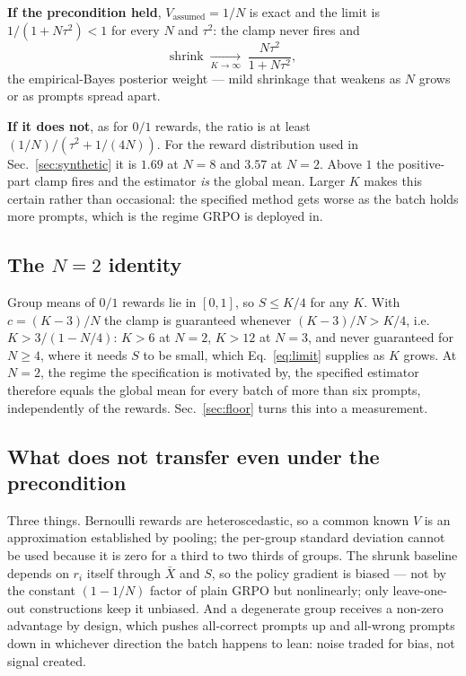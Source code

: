 \documentclass{article}
\newcommand{\shrink}{\mathrm{shrink}}
\begin{document}
\textbf{If the precondition held}, $V_{\text{assumed}}=1/N$ is exact and
the limit is $1/(1+N\tau^2)<1$ for every $N$ and $\tau^2$: the clamp never
fires and
\begin{equation}
\shrink\;\xrightarrow[K\to\infty]{}\;\frac{N\tau^2}{1+N\tau^2},
\label{eq:eb}
\end{equation}
the empirical-Bayes posterior weight --- mild shrinkage that weakens as $N$
grows or as prompts spread apart.

\textbf{If it does not}, as for $0/1$ rewards, the ratio is at least
$(1/N)/(\tau^2+1/(4N))$. For the reward distribution used in
Sec.~\ref{sec:synthetic} it is $1.69$ at $N=8$ and $3.57$ at $N=2$. Above
$1$ the positive-part clamp fires and the estimator \emph{is} the global
mean. Larger $K$ makes this certain rather than occasional: the specified
method gets worse as the batch holds more prompts, which is the regime GRPO
is deployed in.

\subsection{The $N=2$ identity}
\label{sec:identity}

Group means of $0/1$ rewards lie in $[0,1]$, so $S\le K/4$ for any $K$. With
$c=(K-3)/N$ the clamp is guaranteed whenever $(K-3)/N>K/4$, i.e.\
$K>3/(1-N/4)$: $K>6$ at $N=2$, $K>12$ at $N=3$, and never guaranteed for
$N\ge4$, where it needs $S$ to be small, which Eq.~\eqref{eq:limit}
supplies as $K$ grows. At $N=2$, the regime the specification is motivated
by, the specified estimator therefore equals the global mean for every
batch of more than six prompts, independently of the rewards.
Sec.~\ref{sec:floor} turns this into a measurement.

\subsection{What does not transfer even under the precondition}

Three things. Bernoulli rewards are heteroscedastic, so a common known $V$
is an approximation established by pooling; the per-group standard
deviation cannot be used because it is zero for a third to two thirds of
groups. The shrunk baseline depends on $r_i$ itself through $\bar X$ and
$S$, so the policy gradient is biased --- not by the constant $(1-1/N)$
factor of plain GRPO but nonlinearly; only leave-one-out constructions keep
it unbiased. And a degenerate group receives a non-zero advantage by
design, which pushes all-correct prompts up and all-wrong prompts down in
whichever direction the batch happens to lean: noise traded for bias, not
signal created.
\end{document}

